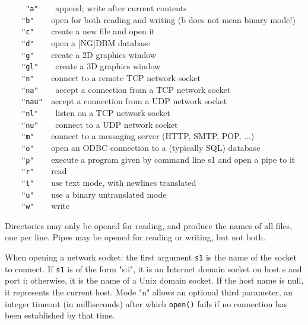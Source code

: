 \ \ \ \ \ \texttt{"a"\ \ \ \ }append; write
after current contents\\
 \ \ \ \ \texttt{"b"\ \ \ \ }open for both
reading and writing (b does not mean binary mode!)\\
 \ \ \ \ \texttt{"c"\ \ \ \ }create a new
file and open it\\
 \ \ \ \ \texttt{"d"\ \ \ \ }open a
[NG]DBM database\\
 \ \ \ \ \texttt{"g"\ \ \ \ }create a 2D
graphics window\\
 \ \ \ \ \texttt{"gl"\ \ \ \ }create a 3D
graphics window\\
 \ \ \ \ \texttt{"n"\ \ \ \ }connect to a
remote TCP network socket\\
 \ \ \ \ \texttt{"na"\ \ \ \ }accept a
connection from a TCP network socket \\
 \ \ \ \ \texttt{"nau"\ \ }accept a
connection from a UDP network socket\\
 \ \ \ \ \texttt{"nl"\ \ \ \ }listen on a
TCP network socket \\
 \ \ \ \ \texttt{"nu"\ \ \ \ }connect to a
UDP network socket\\
 \ \ \ \ \texttt{"m"\ \ \ \ }connect to a
messaging server (HTTP, SMTP, POP, ...)\\
 \ \ \ \ \texttt{"o"\ \ \ \ }open an
ODBC connection to a (typically SQL)
database\\
 \ \ \ \ \texttt{"p"\ \ \ \ }execute a
program given by command line s1 and open a pipe to it\\
 \ \ \ \ \texttt{"r"\ \ \ \ }read\\
 \ \ \ \ \texttt{"t"\ \ \ \ }use text mode,
with newlines translated\\
 \ \ \ \ \texttt{"u"\ \ \ \ }use a binary
untranslated mode\\
 \ \ \ \ \texttt{"w"\ \ \ \ }write

Directories may only be opened for reading, and produce the names of all
files, one per line. Pipes may be opened for reading or writing, but
not both.

When opening a network socket: the first argument \texttt{s1} is the
name of the socket to connect. If \texttt{s1} is of the form
"s:i", it is an Internet domain socket on
host s and port i; otherwise, it is the name of a Unix
domain socket. If the host name is null, it represents the current
host. Mode "n" allows an optional third parameter,
an integer timeout (in milliseconds) after which \texttt{open()} fails
if no connection has been established by that time.


